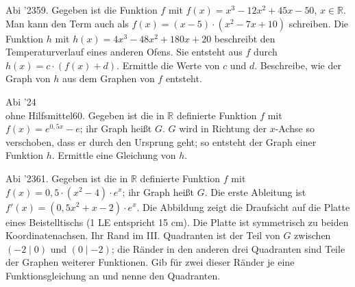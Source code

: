 \documentclass[11pt]{article}
\begin{document}
\begin{pfaufg}{Abi ’23}{59.}{}
Gegeben ist die Funktion $f$ mit $f(x) = x^3 - 12x^2 + 45x - 50$, $x \in \mathbb{R}$. Man kann den Term auch als $f(x) = (x - 5)\cdot(x^2 - 7x + 10)$ schreiben. Die Funktion $h$ mit $h(x) = 4x^3 - 48x^2 + 180x + 20$ beschreibt den Temperaturverlauf eines anderen Ofens. Sie entsteht aus $f$ durch $h(x) = c\cdot(f(x) + d)$. Ermittle die Werte von $c$ und $d$. Beschreibe, wie der Graph von $h$ aus dem Graphen von $f$ entsteht.
\end{pfaufg}
\pfgruppe{}
\begin{pfaufg}{Abi ’24\\ohne Hilfsmittel}{60.}{}
Gegeben ist die in $\mathbb{R}$ definierte Funktion $f$ mit $f(x) = e^{0{,}5x} - e$; ihr Graph heißt $G$. $G$ wird in Richtung der $x$-Achse so verschoben, dass er durch den Ursprung geht; so entsteht der Graph einer Funktion $h$. Ermittle eine Gleichung von $h$.
\end{pfaufg}
\begin{pfaufg}{Abi ’23}{61.}{}
Gegeben ist die in $\mathbb{R}$ definierte Funktion $f$ mit $f(x) = 0{,}5\cdot(x^2 - 4)\cdot e^x$; ihr Graph heißt $G$. Die erste Ableitung ist $f'(x) = (0{,}5x^2 + x - 2)\cdot e^x$. Die Abbildung zeigt die Draufsicht auf die Platte eines Beistelltischs (1 LE entspricht 15 cm). Die Platte ist symmetrisch zu beiden Koordinatenachsen. Ihr Rand im III. Quadranten ist der Teil von $G$ zwischen $(-2 \mid 0)$ und $(0 \mid -2)$; die Ränder in den anderen drei Quadranten sind Teile der Graphen weiterer Funktionen. Gib für zwei dieser Ränder je eine Funktionsgleichung an und nenne den Quadranten.
\par\smallskip\noindent {}\par
{}
\end{pfaufg}
\end{document}
